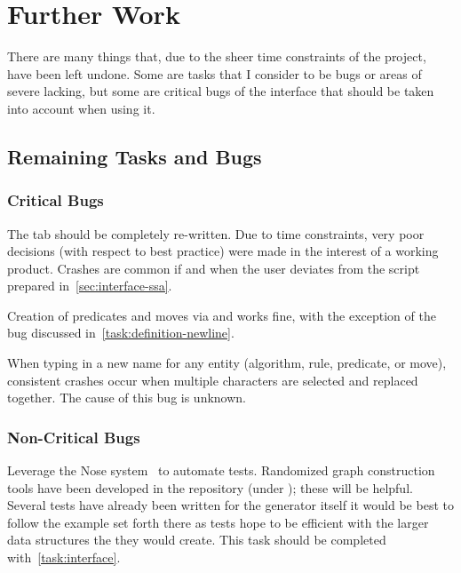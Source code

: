 \section{Further Work}
\label{sec:further-work}

There are many things that, due to the sheer time constraints of the project,
  have been left undone.
Some are tasks that I consider to be bugs or areas of severe lacking,
  but some are critical bugs of the interface that should be taken into account
  when using it.

\subsection{Remaining Tasks and Bugs}
\label{sec:tasks:bugs}

\subsubsection{Critical Bugs}

\begin{task}
  \label{task:alg-aggr}
  The  tab should be completely re-written.
  Due to time constraints, very poor decisions (with respect to best practice)
    were made in the interest of a working product.
  Crashes are common if and when the user deviates from the script prepared in~\autoref{sec:interface-ssa}.

  Creation of predicates and moves via  and  works fine,
    with the exception of the bug discussed in~\autoref{task:definition-newline}.
\end{task}

\begin{task}
  \label{task:update-name}
  When typing in a new name for any entity (algorithm, rule, predicate, or move),
    consistent crashes occur when multiple characters are selected and replaced together.
  The cause of this bug is unknown.
\end{task}

\subsubsection{Non-Critical Bugs}

\begin{task}
  \label{task:test}
  Leverage the Nose system~\autocite{nose} to automate tests.
  Randomized graph construction tools have been developed in the repository
    (under );
  these will be helpful.
  Several tests have already been written for the generator itself \Dash
    it would be best to follow the example set forth there as tests hope to be
    efficient with the larger data structures the they would create.
  This task should be completed with~\autoref{task:interface}.
\end{task}


